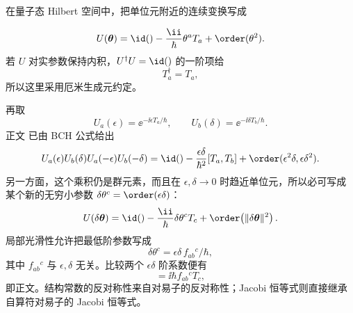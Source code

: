 
\begin{derivation}
在量子态 Hilbert 空间中，把单位元附近的连续变换写成

\begin{equation*}
 U(\boldsymbol\theta)
 =\id()-\frac{\ii}{\hbar}\theta^aT_a+
 \order(\theta^2).
\end{equation*}
若 $U$ 对实参数保持内积，$U^\dagger U=\id()$ 的一阶项给
\begin{equation*}
 T_a^\dagger=T_a,
\end{equation*}
所以这里采用厄米生成元约定。

再取
\begin{equation*}
 U_a(\epsilon)=\ee^{-\ii\epsilon T_a/\hbar},
 \qquad
 U_b(\delta)=\ee^{-\ii\delta T_b/\hbar}.
\end{equation*}
正文 已由 BCH 公式给出
\begin{equation*}
 U_a(\epsilon)U_b(\delta)U_a(-\epsilon)U_b(-\delta)
 =\id()-\frac{\epsilon\delta}{\hbar^2}[T_a,T_b]+
 \order(\epsilon^2\delta,\epsilon\delta^2).
\end{equation*}
另一方面，这个乘积仍是群元素，而且在 $\epsilon,\delta\to0$ 时趋近单位元，所以必可写成某个新的无穷小参数 $\delta\theta^c=\order(\epsilon\delta)$：
\begin{equation*}
 U(\delta\boldsymbol\theta)
 =\id()-\frac{\ii}{\hbar}\delta\theta^cT_c+
 \order\!\left(\|\delta\boldsymbol\theta\|^2\right).
\end{equation*}
局部光滑性允许把最低阶参数写成
\begin{equation*}
 \delta\theta^c=\epsilon\delta\,f_{ab}{}^c/\hbar,
\end{equation*}
其中 $f_{ab}{}^c$ 与 $\epsilon,\delta$ 无关。比较两个 $\epsilon\delta$ 阶系数便有
\begin{equation*}
 [T_a,T_b]=\ii\hbar f_{ab}{}^cT_c,
\end{equation*}
即正文。结构常数的反对称性来自对易子的反对称性；Jacobi 恒等式则直接继承自算符对易子的 Jacobi 恒等式。
\end{derivation}
